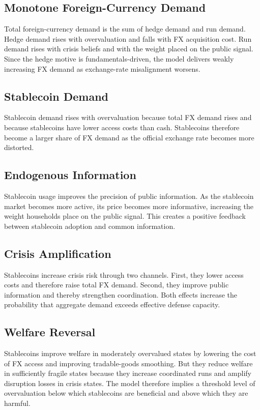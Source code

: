 \documentclass[12pt]{article}
\begin{document}
\subsection{Monotone Foreign-Currency Demand}

Total foreign-currency demand is the sum of hedge demand and run demand. Hedge demand rises with overvaluation and falls with FX acquisition cost. Run demand rises with crisis beliefs and with the weight placed on the public signal. Since the hedge motive is fundamentals-driven, the model delivers weakly increasing FX demand as exchange-rate misalignment worsens.

\subsection{Stablecoin Demand}

Stablecoin demand rises with overvaluation because total FX demand rises and because stablecoins have lower access costs than cash. Stablecoins therefore become a larger share of FX demand as the official exchange rate becomes more distorted.

\subsection{Endogenous Information}

Stablecoin usage improves the precision of public information. As the stablecoin market becomes more active, its price becomes more informative, increasing the weight households place on the public signal. This creates a positive feedback between stablecoin adoption and common information.

\subsection{Crisis Amplification}

Stablecoins increase crisis risk through two channels. First, they lower access costs and therefore raise total FX demand. Second, they improve public information and thereby strengthen coordination. Both effects increase the probability that aggregate demand exceeds effective defense capacity.

\subsection{Welfare Reversal}

Stablecoins improve welfare in moderately overvalued states by lowering the cost of FX access and improving tradable-goods smoothing. But they reduce welfare in sufficiently fragile states because they increase coordinated runs and amplify disruption losses in crisis states. The model therefore implies a threshold level of overvaluation below which stablecoins are beneficial and above which they are harmful.
\end{document}

